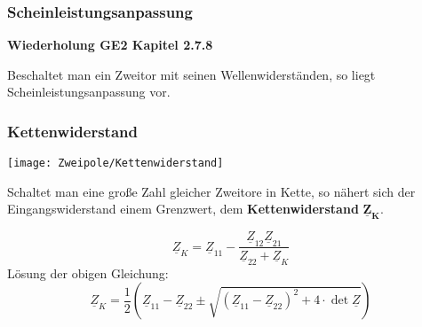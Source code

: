 \subsubsection{Scheinleistungsanpassung}
\textbf{Wiederholung GE2 Kapitel 2.7.8}

Beschaltet man ein Zweitor mit seinen Wellenwiderständen, so liegt
Scheinleistungsanpassung vor.

\subsubsection{Kettenwiderstand}
\centering
\texttt{[image: Zweipole/Kettenwiderstand]}

\raggedright
Schaltet man eine große Zahl gleicher Zweitore in Kette, so nähert sich der
Eingangswiderstand einem Grenzwert, dem \textbf{Kettenwiderstand} $\mathbf{\underline{Z}_K}$.

\[
    \underline{Z}_K = \underline{Z}_{11} - \frac{\underline{Z}_{12}\underline{Z}_{21}}{\underline{Z}_{22}+\underline{Z}_K}
\]
L\"osung der obigen Gleichung:
\[
    \underline{Z}_K = \frac{1}{2}(\underline{Z}_{11} - \underline{Z}_{22} \pm \sqrt{(\underline{Z}_{11}-\underline{Z}_{22})^2+4\cdot\operatorname{det}\underline{Z}})
\]
\footnotesize
{\color{red}{Für symmetrische Zweitore entspricht der Kettenwiderstand dem Wellenwiderstand.  }}
\normalsize
